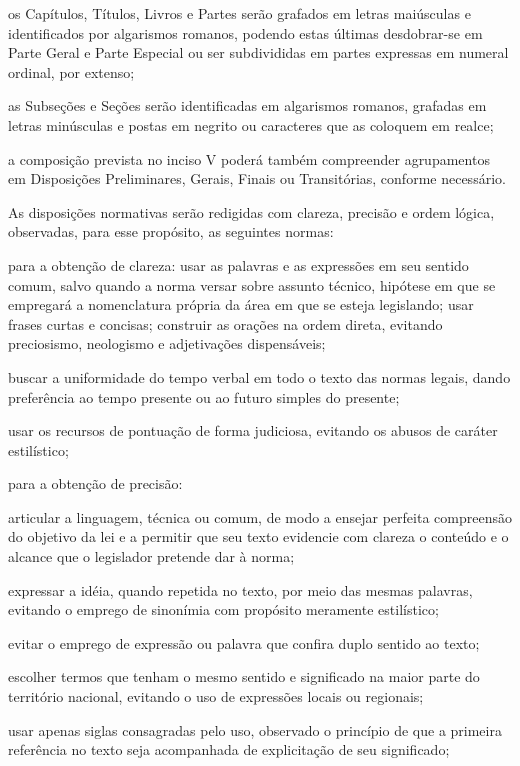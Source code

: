 \documentclass[a5paper,capitulo,titlepage=false]{br-lex}
\begin{document}
\inciso os Capítulos, Títulos, Livros e Partes serão grafados em letras maiúsculas e identificados por algarismos romanos, podendo estas últimas des\-do\-brar\--se em Parte Geral e Parte Especial ou ser subdivididas em partes expressas em numeral ordinal, por extenso;

\inciso as Subseções e Seções serão identificadas em algarismos romanos, grafadas em letras minúsculas e postas em negrito ou caracteres que as coloquem em realce;

\inciso a composição prevista no inciso V poderá também compreender agrupamentos em Disposições Preliminares, Gerais, Finais ou Transitórias, conforme necessário.	


\artigo As disposições normativas serão redigidas com clareza, precisão e ordem lógica, observadas, para esse propósito, as seguintes normas: 


\inciso para a obtenção de clareza:
\alinea usar as palavras e as expressões em seu sentido comum, salvo quando a norma versar sobre assunto técnico, hipótese em que se empregará a nomenclatura própria da área em que se esteja legislando;
\alinea  usar frases curtas e concisas;
\alinea construir as orações na ordem direta, evitando preciosismo, neologismo e adjetivações dispensáveis;

\alinea buscar a uniformidade do tempo verbal em todo o texto das normas legais, dando preferência ao tempo presente ou ao futuro simples do presente;

\alinea usar os recursos de pontuação de forma judiciosa, evitando os abusos de caráter estilístico;

\inciso para a obtenção de precisão:

\alinea articular a linguagem, técnica ou comum, de modo a ensejar perfeita compreensão do objetivo da lei e a permitir que seu texto evidencie com clareza o conteúdo e o alcance que o legislador pretende dar à norma;

\alinea expressar a idéia, quando repetida no texto, por meio das mesmas palavras, evitando o emprego de sinonímia com propósito meramente estilístico;

\alinea evitar o emprego de expressão ou palavra que confira duplo sentido ao texto;

\alinea escolher termos que tenham o mesmo sentido e significado na maior parte do território nacional, evitando o uso de expressões locais ou regionais;

\alinea usar apenas siglas consagradas pelo uso, observado o princípio de que a primeira referência no texto seja acompanhada de explicitação de seu significado;
\end{document}
